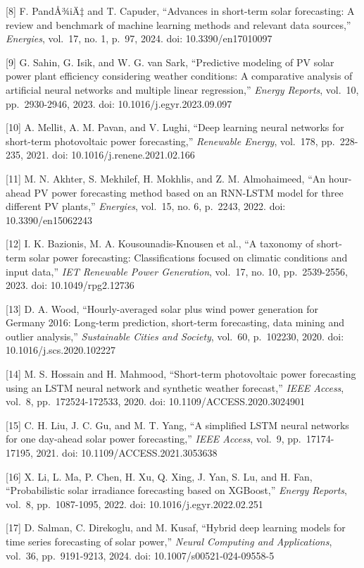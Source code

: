 \documentclass[
  11pt,
]{article}
\begin{document}
{[}8{]} F. PandÅ¾iÄ‡ and T. Capuder, “Advances in short-term solar
forecasting: A review and benchmark of machine learning methods and
relevant data sources,” \emph{Energies}, vol.~17, no. 1, p.~97, 2024.
doi: 10.3390/en17010097

{[}9{]} G. Sahin, G. Isik, and W. G. van Sark, “Predictive modeling of
PV solar power plant efficiency considering weather conditions: A
comparative analysis of artificial neural networks and multiple linear
regression,” \emph{Energy Reports}, vol.~10, pp.~2930-2946, 2023. doi:
10.1016/j.egyr.2023.09.097

{[}10{]} A. Mellit, A. M. Pavan, and V. Lughi, “Deep learning neural
networks for short-term photovoltaic power forecasting,” \emph{Renewable
Energy}, vol.~178, pp.~228-235, 2021. doi: 10.1016/j.renene.2021.02.166

{[}11{]} M. N. Akhter, S. Mekhilef, H. Mokhlis, and Z. M. Almohaimeed,
“An hour-ahead PV power forecasting method based on an RNN-LSTM model
for three different PV plants,” \emph{Energies}, vol.~15, no. 6,
p.~2243, 2022. doi: 10.3390/en15062243

{[}12{]} I. K. Bazionis, M. A. Kousounadis-Knousen et al., “A taxonomy
of short-term solar power forecasting: Classifications focused on
climatic conditions and input data,” \emph{IET Renewable Power
Generation}, vol.~17, no. 10, pp.~2539-2556, 2023. doi:
10.1049/rpg2.12736

{[}13{]} D. A. Wood, “Hourly-averaged solar plus wind power generation
for Germany 2016: Long-term prediction, short-term forecasting, data
mining and outlier analysis,” \emph{Sustainable Cities and Society},
vol.~60, p.~102230, 2020. doi: 10.1016/j.scs.2020.102227

{[}14{]} M. S. Hossain and H. Mahmood, “Short-term photovoltaic power
forecasting using an LSTM neural network and synthetic weather
forecast,” \emph{IEEE Access}, vol.~8, pp.~172524-172533, 2020. doi:
10.1109/ACCESS.2020.3024901

{[}15{]} C. H. Liu, J. C. Gu, and M. T. Yang, “A simplified LSTM neural
networks for one day-ahead solar power forecasting,” \emph{IEEE Access},
vol.~9, pp.~17174-17195, 2021. doi: 10.1109/ACCESS.2021.3053638

{[}16{]} X. Li, L. Ma, P. Chen, H. Xu, Q. Xing, J. Yan, S. Lu, and H.
Fan, “Probabilistic solar irradiance forecasting based on XGBoost,”
\emph{Energy Reports}, vol.~8, pp.~1087-1095, 2022. doi:
10.1016/j.egyr.2022.02.251

{[}17{]} D. Salman, C. Direkoglu, and M. Kusaf, “Hybrid deep learning
models for time series forecasting of solar power,” \emph{Neural
Computing and Applications}, vol.~36, pp.~9191-9213, 2024. doi:
10.1007/s00521-024-09558-5
\end{document}
